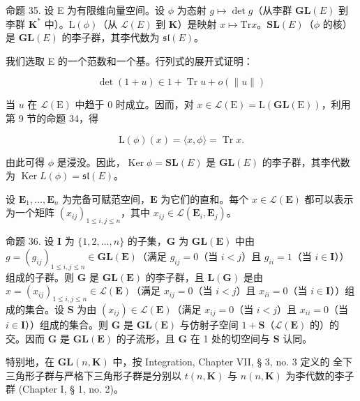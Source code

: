 命题 35. 设 E 为有限维向量空间。设 \(\phi\) 为态射 \(g \mapsto \det g\)（从李群 \(\mathbf{GL}(E)\) 到李群 \(\mathbf{K}^*\) 中）。\(\mathrm{L}(\phi)\)（从 \(\mathcal{L}(E)\) 到 \(\mathbf{K}\)）是映射 \(x \mapsto \mathrm{Tr}x\)。\(\mathbf{SL}(E)\)（\(\phi\) 的核）是 \(\mathbf{GL}(E)\) 的李子群，其李代数为 \(\mathfrak{sl}(E)\)。

我们选取 E 的一个范数和一个基。行列式的展开式证明：

\[
\det (1 + u) \in 1 + \operatorname{Tr} u + o (\| u \|)
\]

当 \(u\) 在 \(\mathcal{L}(\mathrm{E})\) 中趋于 0 时成立。因而，对 \(x \in \mathcal{L}(\mathrm{E}) = \mathrm{L}(\mathbf{GL}(\mathrm{E}))\)，利用第 9 节的命题 34，得

\[
\mathrm{L} (\phi) (x) = \langle x, \phi \rangle = \operatorname{Tr} x.
\]

由此可得 \(\phi\) 是浸没。因此，\(\operatorname{Ker} \phi = \mathbf{SL}(E)\) 是 \(\mathbf{GL}(E)\) 的李子群，其李代数为 \(\operatorname{Ker} L(\phi) = \mathfrak{sl}(E)\)。

设 \(\mathbf{E}_1, \ldots, \mathbf{E}_n\) 为完备可赋范空间，\(\mathbf{E}\) 为它们的直和。每个 \(x \in \mathcal{L}(\mathbf{E})\) 都可以表示为一个矩阵 \((x_{ij})_{1 \leqslant i, j \leqslant n}\)，其中 \(x_{ij} \in \mathcal{L}(\mathbf{E}_i, \mathbf{E}_j)\)。

命题 36. 设 \(\mathbf{I}\) 为 \(\{1,2,\ldots,n\}\) 的子集，\(\mathbf{G}\) 为 \(\mathbf{GL}(\mathbf{E})\) 中由 \(g = (g_{ij})_{1\leqslant i,j\leqslant n}\in \mathbf{GL}(\mathbf{E})\)（满足 \(g_{ij} = 0\)（当 \(i < j\)）且 \(g_{ii} = 1\)（当 \(i\in \mathbf{I}\)））组成的子群。则 \(\mathbf{G}\) 是 \(\mathbf{GL}(\mathbf{E})\) 的李子群，且 \(\mathbf{L}(\mathbf{G})\) 是由 \(x = (x_{ij})_{1\leqslant i,j\leqslant n}\in \mathcal{L}(\mathbf{E})\)（满足 \(x_{ij} = 0\)（当 \(i < j\)）且 \(x_{ii} = 0\)（当 \(i\in \mathbf{I}\)））组成的集合。设 \(\mathbf{S}\) 为由 \((x_{ij})\in \mathcal{L}(\mathbf{E})\)（满足 \(x_{ij} = 0\)（当 \(i < j\)）且 \(x_{ii} = 0\)（当 \(i\in \mathbf{I}\)））组成的集合。则 \(\mathbf{G}\) 是 \(\mathbf{GL}(\mathbf{E})\) 与仿射子空间 \(1 + \mathbf{S}\)（\(\mathcal{L}(\mathbf{E})\) 的）的交。因而 \(\mathbf{G}\) 是 \(\mathbf{GL}(\mathbf{E})\) 的子流形，且 \(\mathbf{G}\) 在 1 处的切空间与 \(\mathbf{S}\) 认同。

特别地，在 \(\mathbf{GL}(n,\mathbf{K})\) 中，按 Integration, Chapter VII, § 3, no. 3 定义的 全下三角形子群与严格下三角形子群是分别以 \(t(n,\mathbf{K})\) 与 \(n(n,\mathbf{K})\) 为李代数的李子群 (Chapter I, § 1, no. 2)。

